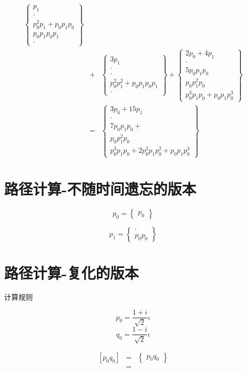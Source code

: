 \documentclass[a4paper,12pt]{article}
\numberwithin{definition}{section}
\numberwithin{lemma}{section}
\numberwithin{proposition}{section}
\numberwithin{theorem}{section}
\numberwithin{grammar}{section}
\numberwithin{program}{section}
\numberwithin{convention}{section}
\numberwithin{corollary}{section}
\numberwithin{principle}{section}
\begin{document}
$$\begin{array}{lcl}
          \begin{Bmatrix} p_1 \\ \cdot \\  p_0^2 p_1  + p_0 p_1 p_0 \\  p_0 p_1 p_0 p_1 \\ \cdot \end{Bmatrix}
          \\
    & + & \begin{Bmatrix} 3 p_1 \\ \cdot \\ \cdot \\ p_0^2 p_1^2 + p_0 p_1 p_0 p_1 \\ \cdot \end{Bmatrix} +
          \begin{Bmatrix} 2 p_0 + 4 p_1 \\ \cdot \\ 5 p_0 p_1 p_0 \\ p_0 p_1^2 p_0 \\ p_0^3 p_1 p_0 + p_0 p_1 p_0^3 \end{Bmatrix}
          \\
    & = & \begin{Bmatrix} 3 p_0 + 15 p_1 \\ \cdot \\ 7 p_0 p_1 p_0 + \\ p_0 p_1^2 p_0 \\ p_0^3 p_1 p_0 + 2 p_0^2 p_1 p_0^2 + p_0 p_1 p_0^3\end{Bmatrix}
\end{array}
$$

\section{路径计算-不随时间遗忘的版本}

$$p_0 = \begin{Bmatrix} p_0 \end{Bmatrix}$$

$$p_1 = \begin{Bmatrix} \cdot \\  p_0 p_0 \end{Bmatrix}$$



\section{路径计算-复化的版本}

计算规则

$$p_0 = \frac{1 + i}{\sqrt{2}} \iota$$
$$q_0 = \frac{1 - i}{\sqrt{2}} \iota$$

$$\begin{array}{lcl}
[p_0 q_0] & = & \begin{Bmatrix} p_0 q_0 \end{Bmatrix} \\
          & = &
\end{array}$$
\end{document}
